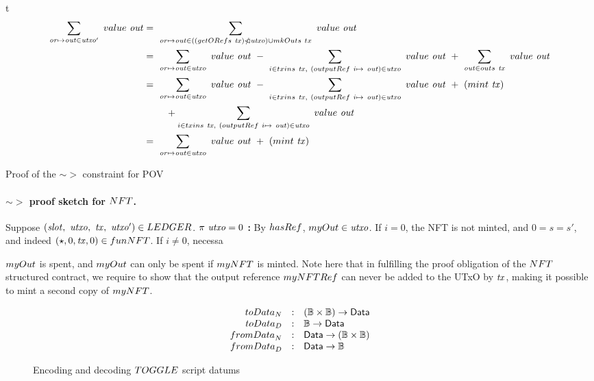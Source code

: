 \begin{ruledfigure}{t}
  \begin{align*}
    \sum_{\var{or}\mapsto \var{out}\in \var{utxo'}}~\val~\var{out}
    & = ~\sum_{\var{or}\mapsto \var{out}\in ((\fun{getORefs}~\var{tx}) \subtractdom \var{utxo}) \cup \fun{mkOuts}~{tx}}~\val~\var{out} \\
    & = ~\sum_{\var{or}\mapsto \var{out}\in \var{utxo}}~\val~\var{out}
    ~-~\sum_{i \in \inputs~\var{tx},~(\outputref~i\mapsto~\var{out})\in \var{utxo}}~\val~\var{out}
    ~+~\sum_{\var{out} \in \outputs ~\var{tx}}~\val~\var{out} \\
    & = ~\sum_{\var{or}\mapsto \var{out}\in \var{utxo}}~\val~\var{out}
    ~-~\sum_{i \in \inputs~\var{tx},~(\outputref~i\mapsto~\var{out})\in \var{utxo}}~\val~\var{out}
    ~+~(\mint~\var{tx}) \\
    &~~~~~~~ + \sum_{i \in \inputs~\var{tx},~(\outputref~i\mapsto~\var{out})\in \var{utxo}}~\val~\var{out} \\
    & = ~\sum_{\var{or}\mapsto \var{out}\in \var{utxo}}~\val~\var{out}  ~+~(\mint~\var{tx})
  \end{align*}
\caption{Proof of the $\sim >$ constraint for POV}
\label{fig:pov-pf}
\end{ruledfigure}

\paragraph{$\sim >$ proof sketch for $\fun{NFT}$. }
\label{pf:nft}
Suppose $(\var{slot},~\var{utxo},~\var{tx},~\var{utxo'}) \in \LEDGER$.
\textbf{$\pi~\mathit{utxo} = 0$ : } By $\fun{hasRef}$, $\fun{myOut} \in \var{utxo}$.
If $i = 0$, the NFT is not minted, and $0 = s = s'$, and indeed
$(\star, 0, \mathit{tx}, 0) \in \\fun{NFT}$. If $i \neq 0$, necessa

 $\fun{myOut}$ is spent, and $\fun{myOut}$ can only be
spent if $\fun{myNFT}$ is minted. Note here that in fulfilling the proof obligation
of the $\fun{NFT}$ structured contract, we require to show that the output reference
$\fun{myNFTRef}$ can never be added to the UTxO by $\mathit{tx}$, making it possible
to mint a second copy of $\fun{myNFT}$.

\begin{figure}
\begin{displaymath}
  \begin{array}{rll}
  \fun{toData}_{N} &:& (\B \times \B) \to \Data \\
  \fun{toData}_{D} &:& \B \to \Data \\
  \fun{fromData}_{N} &:& \Data \to (\B \times \B)\\
  \fun{fromData}_{D} &:& \Data \to \B \\
\end{array}
\end{displaymath}
\caption{Encoding and decoding $\TOGGLE$ script datums}
\label{fig:to-data}
\end{figure}
